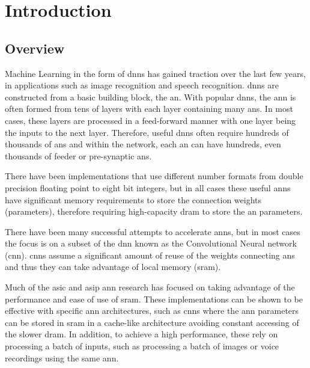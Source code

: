 
\chapter{Introduction}
\label{sec:Introduction}
\label{sec:chap-one}


\section{Overview}
\label{sec:overview}

Machine Learning in the form of \acfp{dnn} has gained traction over the last few years,
in applications such as image recognition and speech recognition.
\acp{dnn} are constructed from a basic building block, the \acf{an}.
With popular \acp{dnn}, the \acf{ann} is often formed from tens of layers with each layer containing many \acp{an}.
In most cases, these layers are processed in a feed-forward manner with one layer being the inputs to the next layer.
Therefore, useful \acp{dnn} often require hundreds of thousands of \acp{an} and within the network, each \ac{an} can have hundreds, even thousands of feeder or pre-synaptic \acp{an}.

There have been implementations that use different number formats from double precision floating point to eight bit integers, but in all cases these useful \ac{ann}s have significant
memory requirements to store the connection weights (parameters), therefore requiring high-capacity \acf{dram} to store the \ac{an} parameters.

There have been many successful attempts to accelerate \ac{ann}s, but in most cases the focus is on a subset of the \ac{dnn} known as the Convolutional Neural network (\ac{cnn}).
\acp{cnn} assume a significant amount of reuse of the weights connecting \acp{an} and thus they can take advantage of local memory (\ac{sram}).

Much of the \ac{asic} and \ac{asip} \ac{ann} research has focused on taking advantage of the performance and ease of use of \ac{sram}.
These implementations can be shown to be effective with specific \ac{ann} architectures, such as \ac{cnn}s where the \ac{ann} parameters can be stored in \ac{sram} in a cache-like architecture avoiding constant accessing of the slower \ac{dram}.
In addition, to achieve a high performance, these rely on processing a batch of inputs, such as processing a batch of images or voice recordings using the same \ac{ann}.

